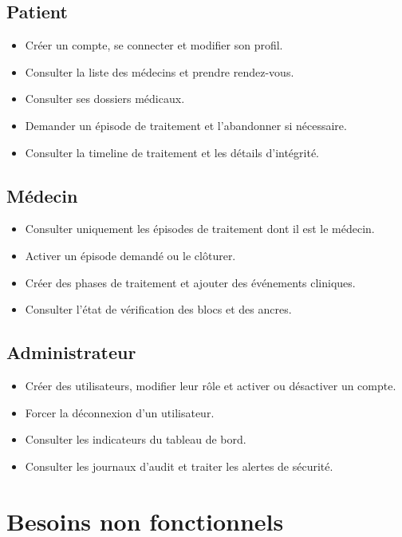 \subsection{Patient}

\begin{itemize}
    \item Créer un compte, se connecter et modifier son profil.
    \item Consulter la liste des médecins et prendre rendez-vous.
    \item Consulter ses dossiers médicaux.
    \item Demander un épisode de traitement et l'abandonner si nécessaire.
    \item Consulter la timeline de traitement et les détails d'intégrité.
\end{itemize}

\subsection{Médecin}

\begin{itemize}
    \item Consulter uniquement les épisodes de traitement dont il est le médecin.
    \item Activer un épisode demandé ou le clôturer.
    \item Créer des phases de traitement et ajouter des événements cliniques.
    \item Consulter l'état de vérification des blocs et des ancres.
\end{itemize}

\subsection{Administrateur}

\begin{itemize}
    \item Créer des utilisateurs, modifier leur rôle et activer ou désactiver un compte.
    \item Forcer la déconnexion d'un utilisateur.
    \item Consulter les indicateurs du tableau de bord.
    \item Consulter les journaux d'audit et traiter les alertes de sécurité.
\end{itemize}

\section{Besoins non fonctionnels}

